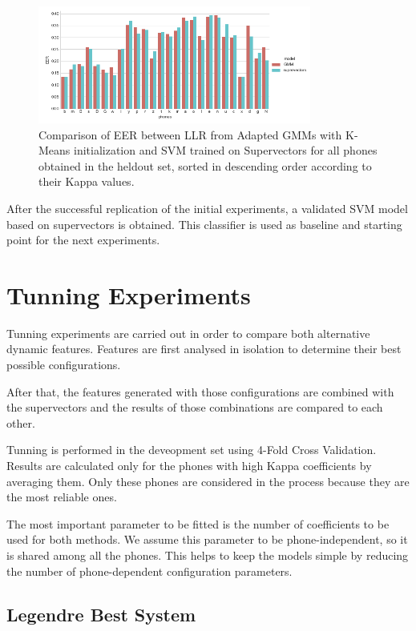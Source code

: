 \begin{figure}[H]
	\centering
	\includegraphics[width=0.8\textwidth]{files/figures/results/gmm-vs-supervectors/gmm-vs-supervectors-heldout.png}
	\caption{Comparison of EER between LLR from Adapted GMMs with K-Means initialization
	and SVM trained on Supervectors for all phones obtained in the heldout set, sorted in descending order according to their Kappa values.}
	\label{fig:gmmSupervectorsTest}
\end{figure}

After the successful replication of the initial experiments, a validated SVM model based on
supervectors is obtained. This classifier is used as baseline and starting point for
the next experiments.

\section{Tunning Experiments}

Tunning experiments are carried out in order to compare both alternative
dynamic features. Features are first analysed in isolation to
determine their best possible configurations.

After that, the features generated with those configurations are combined with
the supervectors and the results of those combinations are compared to each other.

Tunning is performed in the deveopment set using 4-Fold Cross Validation. Results are
calculated only for the phones with high Kappa coefficients by averaging them.
Only these phones are considered in the process because they are the most reliable ones.

The most important parameter to be fitted is the number of coefficients to be used
for both methods. We assume this parameter to be phone-independent,
so it is shared
among all the phones. This helps to keep
the models simple by reducing the number of phone-dependent configuration parameters.

\subsection{Legendre Best System}

